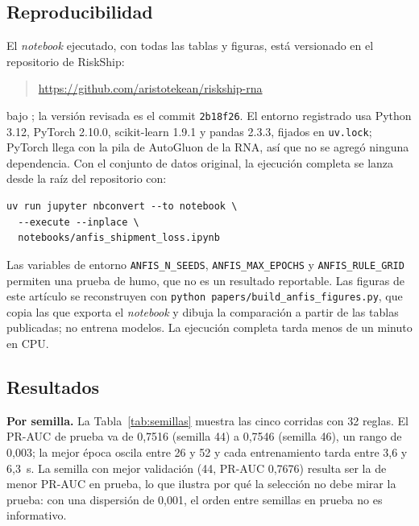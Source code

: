 \documentclass[conference]{IEEEtran}
\begin{document}
\subsection{Reproducibilidad}

El \textit{notebook} ejecutado, con todas las tablas y figuras, está
versionado en el repositorio de RiskShip:
\begin{quote}
\footnotesize
\url{https://github.com/aristotekean/riskship-rna}
\end{quote}
bajo ; la versión revisada es el
commit \texttt{2b18f26}. El entorno registrado usa Python 3.12, PyTorch
2.10.0, scikit-learn 1.9.1 y pandas 2.3.3, fijados en \texttt{uv.lock};
PyTorch llega con la pila de AutoGluon de la RNA, así que no se agregó
ninguna dependencia. Con el conjunto de datos original, la ejecución completa
se lanza desde la raíz del repositorio con:

{\footnotesize
\begin{verbatim}
uv run jupyter nbconvert --to notebook \
  --execute --inplace \
  notebooks/anfis_shipment_loss.ipynb
\end{verbatim}
}
Las variables de entorno \texttt{ANFIS\_N\_SEEDS}, \texttt{ANFIS\_MAX\_EPOCHS}
y \texttt{ANFIS\_RULE\_GRID} permiten una prueba de humo, que no es un
resultado reportable. Las figuras de este artículo se reconstruyen con
\texttt{python papers/build\_anfis\_figures.py}, que copia las que exporta el
\textit{notebook} y dibuja la comparación a partir de las tablas publicadas;
no entrena modelos. La ejecución completa tarda menos de un minuto en CPU.

\subsection{Resultados}

\textbf{Por semilla.} La Tabla~\ref{tab:semillas} muestra las cinco corridas
con 32 reglas. El PR-AUC de prueba va de 0,7516 (semilla 44) a 0,7546
(semilla 46), un rango de 0,003; la mejor época oscila entre 26 y 52 y cada
entrenamiento tarda entre 3,6 y 6,3~s. La semilla con mejor validación (44,
PR-AUC 0,7676) resulta ser la de menor PR-AUC en prueba, lo que ilustra por
qué la selección no debe mirar la prueba: con una dispersión de 0,001, el
orden entre semillas en prueba no es informativo.
\end{document}
